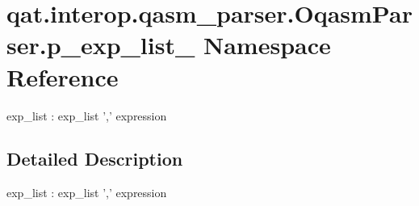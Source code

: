 \hypertarget{namespaceqat_1_1interop_1_1qasm__parser_1_1OqasmParser_1_1p__exp__list__1}{\section{qat.\-interop.\-qasm\-\_\-parser.\-Oqasm\-Parser.\-p\-\_\-exp\-\_\-list\-\_ Namespace Reference}
\label{namespaceqat_1_1interop_1_1qasm__parser_1_1OqasmParser_1_1p__exp__list__1}
}


exp\-\_\-list \-: exp\-\_\-list ',' expression  




\subsection{Detailed Description}
exp\-\_\-list \-: exp\-\_\-list ',' expression 